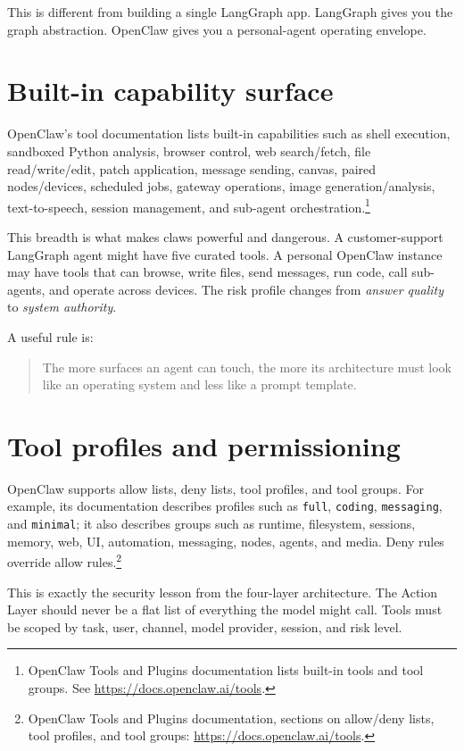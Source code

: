 This is different from building a single LangGraph app. LangGraph gives you the graph abstraction. OpenClaw gives you a personal-agent operating envelope.

\section{Built-in capability surface}

OpenClaw's tool documentation lists built-in capabilities such as shell execution, sandboxed Python analysis, browser control, web search/fetch, file read/write/edit, patch application, message sending, canvas, paired nodes/devices, scheduled jobs, gateway operations, image generation/analysis, text-to-speech, session management, and sub-agent orchestration.\footnote{OpenClaw Tools and Plugins documentation lists built-in tools and tool groups. See \url{https://docs.openclaw.ai/tools}.}

This breadth is what makes claws powerful and dangerous. A customer-support LangGraph agent might have five curated tools. A personal OpenClaw instance may have tools that can browse, write files, send messages, run code, call sub-agents, and operate across devices. The risk profile changes from \emph{answer quality} to \emph{system authority}.

A useful rule is:

\begin{quote}
The more surfaces an agent can touch, the more its architecture must look like an operating system and less like a prompt template.
\end{quote}

\section{Tool profiles and permissioning}

OpenClaw supports allow lists, deny lists, tool profiles, and tool groups. For example, its documentation describes profiles such as \texttt{full}, \texttt{coding}, \texttt{messaging}, and \texttt{minimal}; it also describes groups such as runtime, filesystem, sessions, memory, web, UI, automation, messaging, nodes, agents, and media. Deny rules override allow rules.\footnote{OpenClaw Tools and Plugins documentation, sections on allow/deny lists, tool profiles, and tool groups: \url{https://docs.openclaw.ai/tools}.}

This is exactly the security lesson from the four-layer architecture. The Action Layer should never be a flat list of everything the model might call. Tools must be scoped by task, user, channel, model provider, session, and risk level.

